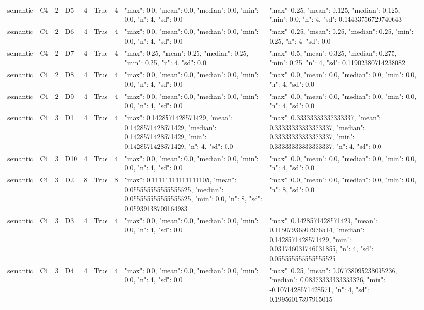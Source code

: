 \begin{tabular}{lllllllll}
semantic & C4 & 2 & D5 & 4 & True & 4 & {"max": 0.0, "mean": 0.0, "median": 0.0, "min": 0.0, "n": 4, "sd": 0.0} & {"max": 0.25, "mean": 0.125, "median": 0.125, "min": 0.0, "n": 4, "sd": 0.14433756729740643} \\
semantic & C4 & 2 & D6 & 4 & True & 4 & {"max": 0.0, "mean": 0.0, "median": 0.0, "min": 0.0, "n": 4, "sd": 0.0} & {"max": 0.25, "mean": 0.25, "median": 0.25, "min": 0.25, "n": 4, "sd": 0.0} \\
semantic & C4 & 2 & D7 & 4 & True & 4 & {"max": 0.25, "mean": 0.25, "median": 0.25, "min": 0.25, "n": 4, "sd": 0.0} & {"max": 0.5, "mean": 0.325, "median": 0.275, "min": 0.25, "n": 4, "sd": 0.11902380714238082} \\
semantic & C4 & 2 & D8 & 4 & True & 4 & {"max": 0.0, "mean": 0.0, "median": 0.0, "min": 0.0, "n": 4, "sd": 0.0} & {"max": 0.0, "mean": 0.0, "median": 0.0, "min": 0.0, "n": 4, "sd": 0.0} \\
semantic & C4 & 2 & D9 & 4 & True & 4 & {"max": 0.0, "mean": 0.0, "median": 0.0, "min": 0.0, "n": 4, "sd": 0.0} & {"max": 0.0, "mean": 0.0, "median": 0.0, "min": 0.0, "n": 4, "sd": 0.0} \\
semantic & C4 & 3 & D1 & 4 & True & 4 & {"max": 0.1428571428571429, "mean": 0.1428571428571429, "median": 0.1428571428571429, "min": 0.1428571428571429, "n": 4, "sd": 0.0} & {"max": 0.33333333333333337, "mean": 0.33333333333333337, "median": 0.33333333333333337, "min": 0.33333333333333337, "n": 4, "sd": 0.0} \\
semantic & C4 & 3 & D10 & 4 & True & 4 & {"max": 0.0, "mean": 0.0, "median": 0.0, "min": 0.0, "n": 4, "sd": 0.0} & {"max": 0.0, "mean": 0.0, "median": 0.0, "min": 0.0, "n": 4, "sd": 0.0} \\
semantic & C4 & 3 & D2 & 8 & True & 8 & {"max": 0.11111111111111105, "mean": 0.055555555555555525, "median": 0.055555555555555525, "min": 0.0, "n": 8, "sd": 0.05939138709164983} & {"max": 0.0, "mean": 0.0, "median": 0.0, "min": 0.0, "n": 8, "sd": 0.0} \\
semantic & C4 & 3 & D3 & 4 & True & 4 & {"max": 0.0, "mean": 0.0, "median": 0.0, "min": 0.0, "n": 4, "sd": 0.0} & {"max": 0.1428571428571429, "mean": 0.11507936507936514, "median": 0.1428571428571429, "min": 0.031746031746031855, "n": 4, "sd": 0.055555555555555525} \\
semantic & C4 & 3 & D4 & 4 & True & 4 & {"max": 0.0, "mean": 0.0, "median": 0.0, "min": 0.0, "n": 4, "sd": 0.0} & {"max": 0.25, "mean": 0.07738095238095236, "median": 0.08333333333333326, "min": -0.1071428571428571, "n": 4, "sd": 0.19956017397905015} \\

\end{tabular}
